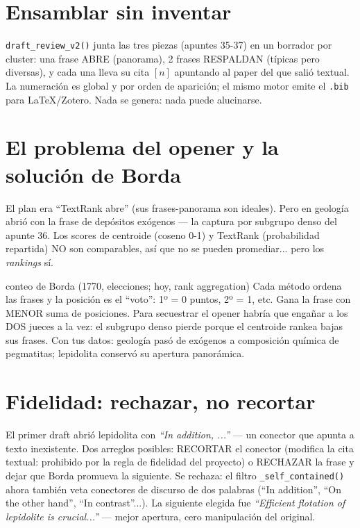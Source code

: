 \documentclass[11pt,a4paper]{article}
\begin{document}

\section{Ensamblar sin inventar}

\texttt{draft\_review\_v2()} junta las tres piezas (apuntes 35-37) en un borrador por
cluster: una frase ABRE (panorama), 2 frases RESPALDAN (típicas pero diversas), y cada
una lleva su cita $[n]$ apuntando al paper del que salió textual. La numeración es
global y por orden de aparición; el mismo motor emite el \texttt{.bib} para LaTeX/Zotero.
Nada se genera: nada puede alucinarse.

\section{El problema del opener y la solución de Borda}

El plan era ``TextRank abre'' (sus frases-panorama son ideales). Pero en geología abrió
con la frase de depósitos exógenos --- la captura por subgrupo denso del apunte 36. Los
scores de centroide (coseno 0-1) y TextRank (probabilidad repartida) NO son comparables,
así que no se pueden promediar... pero los \emph{rankings} sí.

\begin{concepto}{conteo de Borda (1770, elecciones; hoy, rank aggregation)}
Cada método ordena las frases y la posición es el ``voto'': 1º = 0 puntos, 2º = 1, etc.
Gana la frase con MENOR suma de posiciones. Para secuestrar el opener habría que engañar
a los DOS jueces a la vez: el subgrupo denso pierde porque el centroide rankea bajas sus
frases. Con tus datos: geología pasó de exógenos a composición química de pegmatitas;
lepidolita conservó su apertura panorámica.
\end{concepto}

\section{Fidelidad: rechazar, no recortar}

El primer draft abrió lepidolita con \emph{``In addition, ...''} --- un conector que
apunta a texto inexistente. Dos arreglos posibles: RECORTAR el conector (modifica la
cita textual: prohibido por la regla de fidelidad del proyecto) o RECHAZAR la frase y
dejar que Borda promueva la siguiente. Se rechaza: el filtro
\texttt{\_self\_contained()} ahora también veta conectores de discurso de dos palabras
(``In addition'', ``On the other hand'', ``In contrast''...). La siguiente elegida fue
\emph{``Efficient flotation of lepidolite is crucial...''} --- mejor apertura, cero
manipulación del original.
\end{document}
